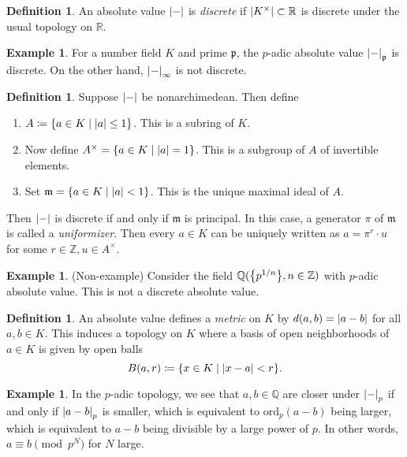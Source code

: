 \documentclass[leqno, openany]{memoir}
\theoremstyle{definition}
\newtheorem{defn}[thm]{Definition}
\newtheorem{exm}[thm]{Example}
\theoremstyle{remark}
\theoremstyle{plain}
\theoremstyle{definition}
\theoremstyle{remark}
\newcommand{\R}{\mathbb{R}}
\newcommand{\Z}{\mathbb{Z}}
\newcommand{\Q}{\mathbb{Q}}
\newcommand{\mf}[1]{\mathfrak{#1}}
\newcommand{\mr}[1]{\mathrm{#1}}
\begin{document}
\begin{defn}
    An absolute value $\abs{-}$ is \textit{discrete} if $\abs{K^{\times}} \subset \R$ is discrete under the usual topology on $\R$. 
\end{defn}

\begin{exm}
    For a number field $K$ and prime $\mf{p}$, the $p$-adic absolute value $\abs{-}_{\mf{p}}$ is discrete. On the other hand, $\abs{-}_{\infty}$ is not discrete.
\end{exm}

\begin{defn}
    Suppose $\abs{-}$ be nonarchimedean. Then define 
    \begin{enumerate}
        \item $A \coloneqq \qty{a \in K \mid \abs{a} \leq 1}$. This is a subring of $K$.
        \item Now define $A^{\times} = \qty{a \in K \mid \abs{a} = 1}$. This is a subgroup of $A$ of invertible elements.
        \item Set $\mf{m} = \qty{a \in K \mid \abs{a} < 1}$. This is the unique maximal ideal of $A$.
    \end{enumerate}
    Then $\abs{-}$ is discrete if and only if $\mf{m}$ is principal. In this case, a generator $\pi$ of $\mf{m}$ is called a \textit{uniformizer}. Then every $a \in K$ can be uniquely written as $a = \pi^r \cdot u$ for some $r \in \Z, u \in A^{\times}$.
\end{defn}

\begin{exm}(Non-example)
    Consider the field $\Q(\qty{p^{1/n}}, n \in \Z)$ with $p$-adic absolute value. This is not a discrete absolute value.
\end{exm}

\begin{defn}
    An absolute value defines a \textit{metric} on $K$ by $d(a,b) = \abs{a-b}$ for all $a,b \in K$. This induces a topology on $K$ where a basis of open neighborhoods of $a \in K$ is given by open balls 
    \[ B(a,r) \coloneqq \qty{x \in K \mid \abs{x-a} < r}. \]
\end{defn}

\begin{exm}
    In the $p$-adic topology, we see that $a,b \in \Q$ are closer under $\abs{-}_p$ if and only if $\abs{a-b}_{p}$ is smaller, which is equivalent to $\mr{ord}_p(a-b)$ being larger, which is equivalent to $a-b$ being divisible by a large power of $p$. In other words, $a \equiv b \pmod p^N$ for $N$ large.
\end{exm}
\end{document}
